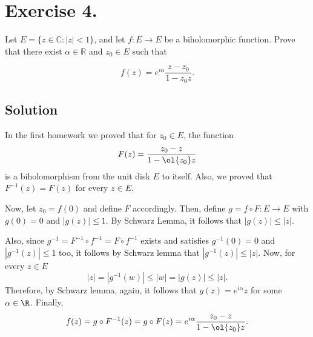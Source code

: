 
\section{Exercise 4.}

Let \( E = \{ z \in \mathbb{C} : |z| < 1 \} \), and let \( f: E \rightarrow E \) be a biholomorphic function. Prove that there exist \( \alpha \in \mathbb{R} \) and \( z_0 \in E \) such that

\[
f(z) = e^{i\alpha} \frac{z - z_0}{1 - \overline{z_0} z}.
\]

\subsection*{Solution}

In the first homework we proved that for $z_0 \in E$, the function
\[ F(z) = \frac{z_0 - z}{1 - \ol{z_0} z} \]
is a biholomorphism from the unit disk $E$ to itself. Also, we proved that $F^{-1}(z) = F(z)$ for every $z \in E$.

Now, let $z_0 = f(0)$ and define $F$ accordingly. Then, define $g = f \circ F: E \to E$ with $g(0) = 0$ and $|g(z)| \leq 1$. By Schwarz Lemma, it follows that $|g(z)| \leq |z|$.

Also, since $g^{-1} = F^{-1} \circ f^{-1} = F \circ f^{-1}$ exists and satisfies $g^{-1}(0) = 0$ and $|g^{-1}(z)| \leq 1$ too, it follows by Schwarz lemma that $|g^{-1}(z)| \leq |z|$. Now, for every $z \in E$
\[ |z| = |g^{-1}(w)| \leq |w| = |g(z)| \leq |z|. \]
Therefore, by Schwarz lemma, again, it follows that $g(z) = e^{i\alpha} z$ for some $\alpha \in \R$. Finally,
\[ f(z) = g\circ F^{-1}(z) = g\circ F(z) = e^{i\alpha} \frac{z_0-z}{1-\ol{z_0} z}. \]